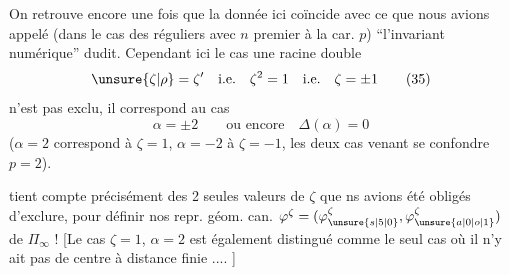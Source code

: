 On retrouve encore une fois que  la donnée ici coïncide avec ce que nous avions appelé (dans le cas des  réguliers avec $n$ premier à la car. $p$) ``l'invariant numérique'' dudit. Cependant ici le cas une racine double
\[
\unsure{\zeta|\rho}=\zeta' \quad \text{i.e.}\quad \zeta^{2}=1 \quad \text{i.e.}\quad \zeta=\pm1 \tag*{(35)}
\]
n'est pas exclu, il correspond au cas
\[
\alpha=\pm2 \qquad \text{ou encore}\quad \Delta(\alpha)=0 \tag*{(36)}
\]
($\alpha=2$ correspond à $\zeta=1$, $\alpha=-2$ à $\zeta=-1$, les deux cas venant se confondre  $p=2$).

 tient compte précisément des 2 seules valeurs de $\zeta$ que ns avions été obligés d'exclure, pour définir nos repr. géom. can. $\varphi^\zeta=(\varphi_{\unsure{s|5|0}}^\zeta,\varphi_{\unsure{a|0|o|1}}^\zeta)$ de $\Pi_\infty$ ! [Le cas $\zeta=1$, $\alpha=2$ est également distingué  comme le seul cas où il n'y ait pas de centre à distance finie .... ]
